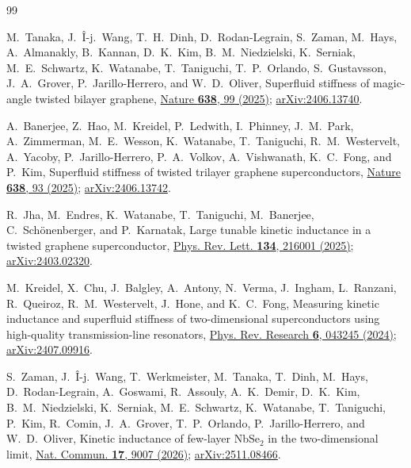 \documentclass[aps,prb,reprint,superscriptaddress,longbibliography]{revtex4-2}
\begin{document}
\begin{thebibliography}{99}
\raggedright

M.~Tanaka, J.~\^{I}-j.~Wang, T.~H.~Dinh, D.~Rodan-Legrain, S.~Zaman,
M.~Hays, A.~Almanakly, B.~Kannan, D.~K.~Kim, B.~M.~Niedzielski,
K.~Serniak, M.~E.~Schwartz, K.~Watanabe, T.~Taniguchi, T.~P.~Orlando,
S.~Gustavsson, J.~A.~Grover, P.~Jarillo-Herrero, and W.~D.~Oliver,
Superfluid stiffness of magic-angle twisted bilayer graphene,
\href{https://doi.org/10.1038/s41586-024-08494-7}{Nature \textbf{638},
99 (2025)}; \href{https://arxiv.org/abs/2406.13740}{arXiv:2406.13740}.

A.~Banerjee, Z.~Hao, M.~Kreidel, P.~Ledwith, I.~Phinney, J.~M.~Park,
A.~Zimmerman, M.~E.~Wesson, K.~Watanabe, T.~Taniguchi,
R.~M.~Westervelt, A.~Yacoby, P.~Jarillo-Herrero, P.~A.~Volkov,
A.~Vishwanath, K.~C.~Fong, and P.~Kim, Superfluid stiffness of twisted
trilayer graphene superconductors,
\href{https://doi.org/10.1038/s41586-024-08444-3}{Nature \textbf{638},
93 (2025)}; \href{https://arxiv.org/abs/2406.13742}{arXiv:2406.13742}.

R.~Jha, M.~Endres, K.~Watanabe, T.~Taniguchi, M.~Banerjee,
C.~Sch\"onenberger, and P.~Karnatak, Large tunable kinetic inductance in
a twisted graphene superconductor,
\href{https://doi.org/10.1103/PhysRevLett.134.216001}{Phys. Rev. Lett.
\textbf{134}, 216001 (2025)};
\href{https://arxiv.org/abs/2403.02320}{arXiv:2403.02320}.

M.~Kreidel, X.~Chu, J.~Balgley, A.~Antony, N.~Verma, J.~Ingham,
L.~Ranzani, R.~Queiroz, R.~M.~Westervelt, J.~Hone, and K.~C.~Fong,
Measuring kinetic inductance and superfluid stiffness of two-dimensional
superconductors using high-quality transmission-line resonators,
\href{https://doi.org/10.1103/PhysRevResearch.6.043245}{Phys. Rev.
Research \textbf{6}, 043245 (2024)};
\href{https://arxiv.org/abs/2407.09916}{arXiv:2407.09916}.

S.~Zaman, J.~\^{I}-j.~Wang, T.~Werkmeister, M.~Tanaka, T.~Dinh, M.~Hays,
D.~Rodan-Legrain, A.~Goswami, R.~Assouly, A.~K.~Demir, D.~K.~Kim,
B.~M.~Niedzielski, K.~Serniak, M.~E.~Schwartz, K.~Watanabe,
T.~Taniguchi, P.~Kim, R.~Comin, J.~A.~Grover, T.~P.~Orlando,
P.~Jarillo-Herrero, and W.~D.~Oliver, Kinetic inductance of few-layer
NbSe$_2$ in the two-dimensional limit,
\href{https://doi.org/10.1038/s41467-026-75672-8}{Nat. Commun.
\textbf{17}, 9007 (2026)};
\href{https://arxiv.org/abs/2511.08466}{arXiv:2511.08466}.


\end{thebibliography}
\end{document}
